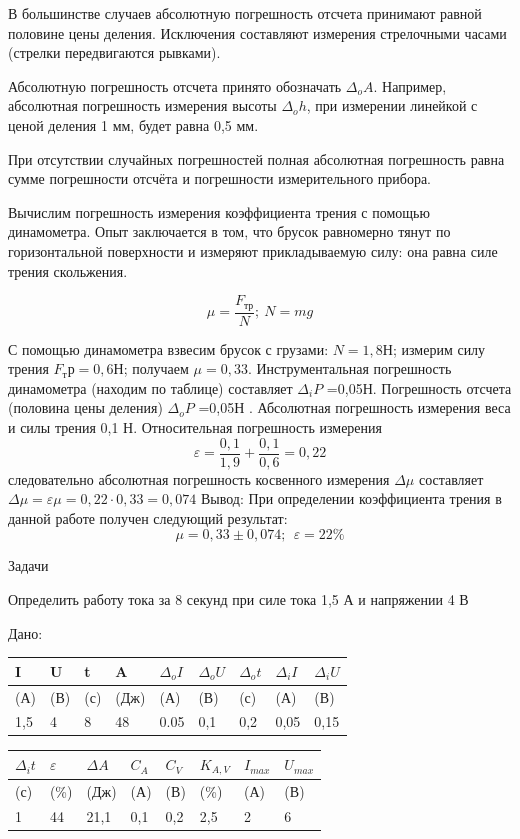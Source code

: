 \documentclass[a6paper, 11pt]{diss_4}
\renewcommand{\'}{\,'}
\begin{document}
 В большинстве случаев абсолютную погрешность отсчета принимают равной
половине цены деления. Исключения составляют измерения стрелочными часами
(стрелки передвигаются рывками).

  Абсолютную погрешность отсчета принято обозначать $\Delta_o A$. Например,
абсолютная погрешность измерения высоты $\Delta_o h$, при измерении линейкой
с ценой деления 1 мм, будет равна 0,5 мм.

 При отсутствии случайных погрешностей полная абсолютная погрешность равна
сумме погрешности отсчёта и погрешности измерительного прибора.

 Вычислим погрешность измерения коэффициента трения с помощью динамометра.
Опыт заключается в том, что брусок равномерно тянут по горизонтальной
поверхности и измеряют прикладываемую силу: она равна силе трения скольжения.

\[\mu=\frac{F_{тр}}{N}; \ N=mg\]


  С помощью динамометра взвесим брусок с грузами: $N=1,8Н$; измерим силу
трения $F_тр=0,6Н$; получаем $\mu=0,33$. Инструментальная погрешность
динамометра (находим по таблице) составляет $\Delta_i P$ =0,05Н. Погрешность
отсчета (половина цены деления) $\Delta_o P$ =0,05Н . Абсолютная погрешность
измерения веса и силы трения 0,1 Н. Относительная погрешность измерения
\[\varepsilon=\frac{0,1}{1,9}+\frac{0,1}{0,6}=0,22\] следовательно абсолютная
погрешность косвенного измерения $\Delta\mu$ составляет
$\Delta\mu=\varepsilon\mu=0,22\cdot0,33=0,074$ Вывод: При определении коэффициента
 трения в данной работе получен следующий результат: \[\mu=0,33\pm0,074;\ \
\varepsilon=22\%\]

\begin{center}
   Задачи
\end{center}


Определить работу тока за 8 секунд при силе тока 1,5 А и напряжении 4 В

Дано:
\begin{center}
\begin{tabular}[c]{l|l|l|l|l|l|l|l|l}
I & U & t & A & $\Delta_o I$ & $\Delta_o U$ & $\Delta_o t$ &
$\Delta_i I$ & $\Delta_i U$
\\ \hline
(А) & (В) & (с) & (Дж) & (А) & (В) & (с) & (А) & (В)
\\ \hline
1,5 & 4 & 8 & 48 & 0.05 & 0,1 & 0,2 & 0,05 & 0,15
\end{tabular}

\begin{tabular}[c]{l|l|l|l|l|l|l|l}
$\Delta_i t$ & $\varepsilon$ & $\Delta A$
& ${C_A}$ & ${C_V}$ & ${K_{A,V}}$ & ${I_{max}}$ & ${U_{max}}$\\ \hline
(с) & (\%) & (Дж) & (А) & (В) & (\%) & (А) & (В) \\ \hline
1 & 44 & 21,1 & 0,1 & 0,2 & 2,5 & 2 & 6 \\
\end{tabular}
\end{center}
\end{document}
